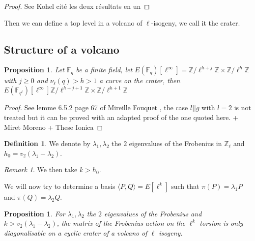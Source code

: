 \documentclass{article}
\theoremstyle{plain}
\newtheorem{prop}[thm]{Proposition}
\theoremstyle{definition}
\newtheorem{defi}[thm]{Definition}
\theoremstyle{remark}
\newtheorem{rem}[thm]{Remark}
\begin{document}
\begin{proof}
See Kohel cité les deux résultats en un
\end{proof}

Then we can define a top level in a volcano of $\ell$-isogeny, we call it the crater.


\subsection{Structure of a volcano}

\begin{prop} \label{structelevation}
Let $\mathbb{F}_q$ be a finite field, let $E(\mathbb{F}_q)[\ell^{\infty}]=\mathbb{Z}/\ell^{h+j}\mathbb{Z} \times \mathbb{Z}/\ell^{h}\mathbb{Z}$ with $ j \geqslant 0$ and $\nu_\ell(q)>h>1$ a curve on the crater, then $E(\mathbb{F}_{q^\ell})[\ell^{\infty}]  \mathbb{Z}/\ell^{h+j+1}\mathbb{Z} \times \mathbb{Z}/\ell^{h+1}\mathbb{Z}$
\end{prop}

\begin{proof}
See lemme 6.5.2 page 67  of Mireille Fouquet \cite{Fouquet01}, the case $l ||g$ with $l=2$ is not treated but it can be proved with an adapted proof of the one quoted here. + Miret Moreno + These Ionica
\end{proof}

\begin{defi}
We denote by $\lambda_1 , \lambda_2$ the $2$ eigenvalues of the Frobenius in $\mathbb{Z}_\ell$ and $h_0=v_2(\lambda_1-\lambda_2)$. 
\end{defi}

\begin{rem}
We then take $k>h_0$.  
\end{rem}

We will now try to determine a basis $\langle P,Q \rangle = E[\ell^k]$ such that $\pi(P)=\lambda_1 P $ and $\pi(Q)=\lambda_2 Q $.

\begin{prop}
For $\lambda_1 , \lambda_2$ the $2$ eigenvalues of the Frobenius and $k>v_2(\lambda_1-\lambda_2)$, the matrix of the Frobenius action on the $\ell^k$ torsion is only diagonalisable on a cyclic crater of a volcano of $\ell$ isogeny.
\end{prop}
\end{document}
